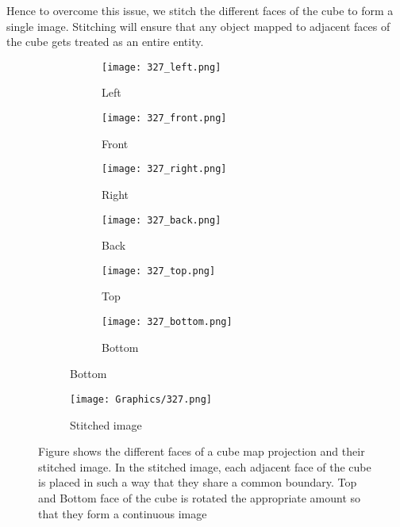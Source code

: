 \par
Hence to overcome this issue, we stitch the different faces of the cube to form a single image. Stitching will ensure that any object mapped to adjacent faces of the cube gets treated as an entire entity.
\begin{figure}[t]
    \centering
    \begin{subfigure}[b]{0.45\textwidth}
        \centering
        \begin{subfigure}[b]{0.3\linewidth}
        \centering
            \texttt{[image: 327\_left.png]}
            \caption{Left}
        \end{subfigure}
        \begin{subfigure}[b]{0.3\linewidth}
        \centering
            \texttt{[image: 327\_front.png]}
            \caption{Front}
        \end{subfigure}
        \begin{subfigure}[b]{0.3\linewidth}
        \centering
            \texttt{[image: 327\_right.png]}
            \caption{Right}
        \end{subfigure}
        \begin{subfigure}[b]{0.3\linewidth}
        \centering
            \texttt{[image: 327\_back.png]}
            \caption{Back}
        \end{subfigure}
        \begin{subfigure}[b]{0.3\linewidth}
        \centering
            \texttt{[image: 327\_top.png]}
            \caption{Top}
        \end{subfigure}
        \begin{subfigure}[b]{0.3\linewidth}
        \centering
            \texttt{[image: 327\_bottom.png]}
            \caption{Bottom}
        \end{subfigure}
    \end{subfigure}
    \begin{subfigure}[b]{0.45\textwidth}
        \centering
            \texttt{[image: Graphics/327.png]}
            \caption{Stitched image}
    \end{subfigure}
    \caption{Figure shows the different faces of a cube map projection and their stitched image. In the stitched image, each adjacent face of the cube is placed in such a way that they share a common boundary. Top and Bottom face of the cube is rotated the appropriate amount so that they form a continuous image}
\end{figure}


